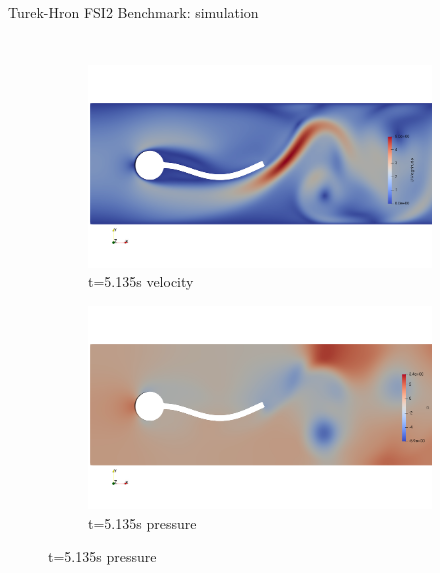 \documentclass[10pt,t]{beamer}
\begin{document}
\begin{frame}{Turek-Hron FSI2 Benchmark: simulation}
\begin{columns}
\begin{figure}[htb]
\begin{subfigure}{0.5\textwidth}
  \includegraphics[width=\linewidth, trim=0 120 0 120, clip]{images/FSI2/fsi2_v2.png}
  \caption{t=5.135s velocity}
  \label{fig:fsi2_v2}
\end{subfigure}\hfil %
\begin{subfigure}{0.5\textwidth}
  \includegraphics[width=\linewidth, trim=0 120 0 120, clip]{images/FSI2/fsi2_p2.png}
  \caption{t=5.135s pressure}
  \label{fig:fsi2_p2}
\end{subfigure}\hfil %

\medskip


\end{figure}
\end{columns}
\end{frame}
\end{document}
